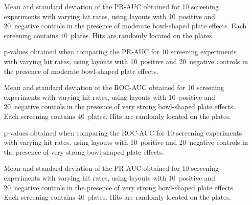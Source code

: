 \begin{table}[p]
    \centering
    \small
    
    \caption{Mean and standard deviation of the PR-AUC obtained for 10 screening experiments with varying hit rates, using layouts with 10~positive and 20~negative controls in the presence of moderate bowl-shaped plate effects. Each screening contains 40~plates. Hits are randomly located on the plates.}
    \label{tab:screening-pr_20-10-0.1}
\end{table}

\begin{table}[p]
    \centering
    \small
    
    \caption{p-values obtained when comparing the PR-AUC for 10 screening experiments with varying hit rates, using layouts with 10~positive and 20~negative controls in the presence of moderate bowl-shaped plate effects.}
    \label{tab:screening-pr_pvalues-20-10-0.1}
\end{table}

\clearpage
\begin{table}[p]
    \centering
    \small
    
    \caption{Mean and standard deviation of the ROC-AUC obtained for 10 screening experiments with varying hit rates, using layouts with 10~positive and 20~negative controls in the presence of very strong bowl-shaped plate effects. Each screening contains 40~plates. Hits are randomly located on the plates.}
    \label{tab:screening-roc_20-10-0.2}
\end{table}

\begin{table}[p]
    \centering
    \small
    
    \caption{p-values obtained when comparing the ROC-AUC for 10 screening experiments with varying hit rates, using layouts with 10~positive and 20~negative controls in the presence of very strong bowl-shaped plate effects.}
    \label{tab:screening-roc_pvalues-20-10-0.2}
\end{table}

\begin{table}[p]
    \centering
    \small
    
    \caption{Mean and standard deviation of the PR-AUC obtained for 10 screening experiments with varying hit rates, using layouts with 10~positive and 20~negative controls in the presence of very strong bowl-shaped plate effects. Each screening contains 40~plates. Hits are randomly located on the plates.}
    \label{tab:screening-pr_20-10-0.2}
\end{table}


